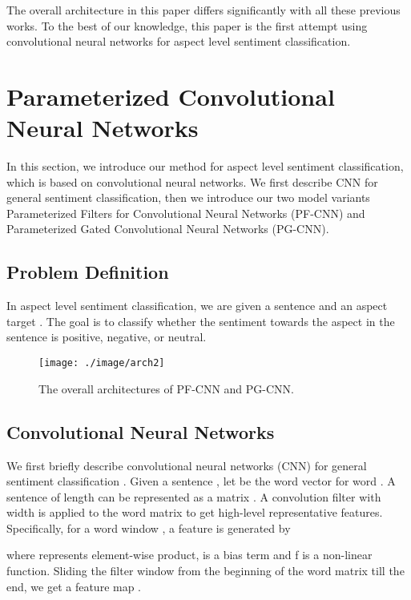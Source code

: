 \documentclass[11pt,a4paper]{article}
\begin{document}
The overall architecture in this paper differs significantly with all these previous works. To the best of our knowledge, this paper is the first attempt using convolutional neural networks \cite{kim2014convolutional,huang2017predicting} for aspect level sentiment classification. 
\section{Parameterized Convolutional Neural Networks}

In this section, we introduce our method for aspect level sentiment classification, which is based on convolutional neural networks. We first describe CNN for general sentiment classification, then we introduce our two model variants Parameterized Filters for Convolutional Neural Networks (PF-CNN) and Parameterized Gated Convolutional Neural Networks (PG-CNN).

\subsection{Problem Definition}
In aspect level sentiment classification, we are given a sentence   and an aspect target . The goal is to classify whether the sentiment towards the aspect in the sentence is positive, negative, or neutral.

\begin{figure*}[!h]
    \centering
    \texttt{[image: ./image/arch2]}
      \vspace{-1cm}
    \caption{The overall architectures of PF-CNN and PG-CNN.}
    \vspace{-0.5cm}
    \label{arch}
\end{figure*}
\subsection{Convolutional Neural Networks}
We first briefly describe convolutional neural networks (CNN) for general sentiment classification \cite{kim2014convolutional}. Given a sentence  , let  be the word vector for word . A sentence of length  can be represented as a matrix . A convolution filter  with width  is applied to the word matrix to get high-level representative features. Specifically, for a word window , a feature  is generated by

\vspace{-0.3cm}

where  represents element-wise product,  is a bias term and f is a non-linear function. Sliding the filter window from the beginning of the word matrix till the end, we get a feature map .
\vspace{-0.3cm}
\end{document}
